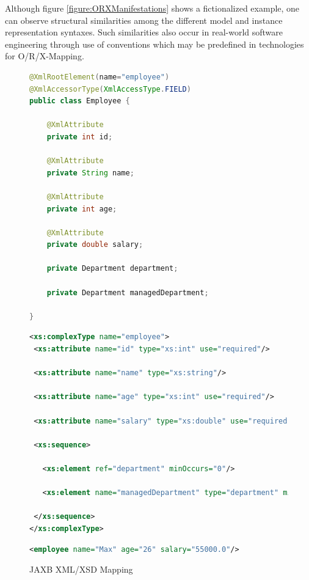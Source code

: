 Although figure \ref{figure:ORXManifestations} shows a fictionalized example, one can observe structural similarities among the different model and instance representation syntaxes.
Such similarities also occur in real-world software engineering through use of conventions which may be predefined in technologies for \gls{O/R/X-Mapping}.
\begin{figure}[h!]
\begin{center}
\begin{minipage}{.49\textwidth}
\begin{lstlisting}[language=Java,numbers=none]
@XmlRootElement(name="employee")
@XmlAccessorType(XmlAccessType.FIELD)
public class Employee {

	@XmlAttribute
	private int id;
	
	@XmlAttribute
	private String name;
	
	@XmlAttribute
	private int age;
	
	@XmlAttribute
	private double salary;
	
	private Department department;
	
	private Department managedDepartment;
	
}
\end{lstlisting}
\end{minipage}
\hspace*{\fill}
\begin{minipage}{.49\textwidth}
\begin{lstlisting}[language=XML,numbers=none]
<xs:complexType name="employee">
 <xs:attribute name="id" type="xs:int" use="required"/>

 <xs:attribute name="name" type="xs:string"/>

 <xs:attribute name="age" type="xs:int" use="required"/>

 <xs:attribute name="salary" type="xs:double" use="required"/>
 
 <xs:sequence>
 
   <xs:element ref="department" minOccurs="0"/>
 
   <xs:element name="managedDepartment" type="department" minOccurs="0"/>
 
 </xs:sequence>
</xs:complexType>
\end{lstlisting}
\end{minipage}
\begin{minipage}{\textwidth}
\begin{lstlisting}[language=XML,numbers=none]
<employee name="Max" age="26" salary="55000.0"/>
\end{lstlisting}
\end{minipage}
\end{center}
\caption{JAXB XML/XSD Mapping}
\label{figure:JAXBMapping}
\end{figure}
